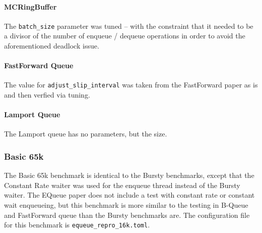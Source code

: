 \paragraph{MCRingBuffer}
The \texttt{batch\_size} parameter was tuned -- with the constraint that it needed to be a divisor of the
number of enqueue / dequeue operations in order to avoid the aforementioned deadlock issue.

\paragraph{FastForward Queue}
The value for \texttt{adjust\_slip\_interval} was taken from the FastForward paper as is and then verfied via tuning.

\paragraph{Lamport Queue}
The Lamport queue has no parameters, but the size.

\subsubsection{Basic 65k}
The Basic 65k benchmark is identical to the Bursty benchmarks, except that the Constant Rate waiter was used
for the enqueue thread instead of the Bursty waiter.
The EQueue paper does not include a test with constant rate or constant wait enqueueing, but this
benchmark is more similar to the testing in B-Queue and FastForward queue than the Bursty benchmarks are.
The configuration file for this benchmark is \texttt{equeue\_repro\_16k.toml}.
